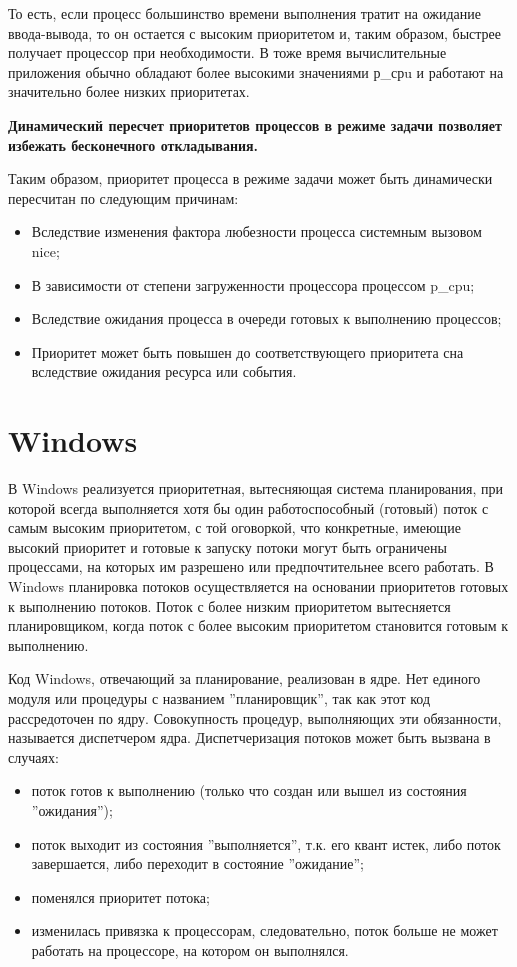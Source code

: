 То есть, если процесс большинство времени выполнения тратит на ожидание ввода-вывода, то он остается с высоким приоритетом и, таким образом, быстрее получает процессор при необходимости.
В тоже время вычислительные приложения обычно обладают более высокими значениями р\_срu и работают на значительно более низких приоритетах.

\textbf{Динамический пересчет приоритетов процессов в режиме задачи позволяет избежать бесконечного откладывания.}

Таким образом, приоритет процесса в режиме задачи может быть динамически пересчитан по следующим причинам:
\begin{itemize}
	\item Вследствие изменения фактора любезности процесса системным вызовом nice;
	\item В зависимости от степени загруженности процессора процессом p\_cpu;
	\item Вследствие ожидания процесса в очереди готовых к выполнению процессов;
	\item Приоритет может быть повышен до соответствующего приоритета сна вследствие ожидания ресурса или события.
\end{itemize}

\section*{Windows}
В Windows реализуется приоритетная, вытесняющая система планирования, при которой всегда выполняется хотя бы один работоспособный (готовый) поток с самым высоким приоритетом, с той оговоркой, что конкретные, имеющие высокий приоритет и готовые к запуску потоки могут быть
ограничены процессами, на которых им разрешено или предпочтительнее всего работать.
В Windows планировка потоков осуществляется на основании приоритетов готовых к выполнению потоков. 
Поток с более низким приоритетом вытесняется планировщиком, когда поток с более высоким приоритетом становится готовым к выполнению.

Код Windows, отвечающий за планирование, реализован в ядре. Нет единого модуля или процедуры с названием ”планировщик”, так как этот
код рассредоточен по ядру. 
Совокупность процедур, выполняющих эти обязанности, называется диспетчером ядра. 
Диспетчеризация потоков может быть вызвана в случаях:
\begin{itemize}
	\item поток готов к выполнению (только что создан или вышел из состояния ”ожидания”);
	\item поток выходит из состояния ”выполняется”, т.к. его квант истек, либо поток завершается, либо переходит в состояние ”ожидание”;
	\item поменялся приоритет потока;
	\item изменилась привязка к процессорам, следовательно, поток больше не может работать на процессоре, на котором он выполнялся.
\end{itemize}

